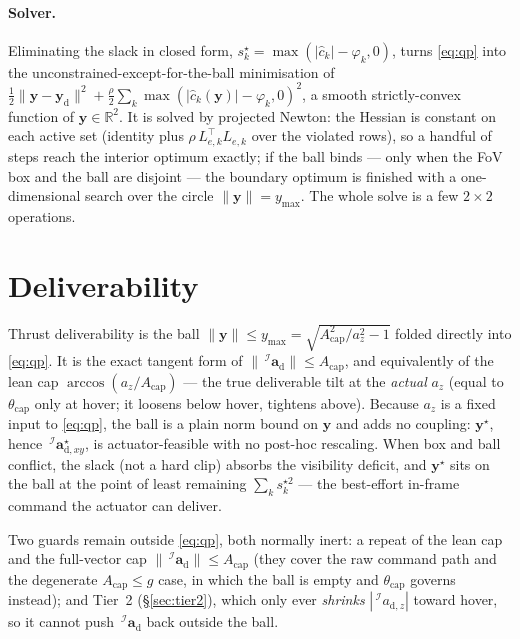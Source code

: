 \documentclass[11pt]{article}
\newcommand{\Iframe}{\mathcal{I}}
\begin{document}
\paragraph{Solver.} Eliminating the slack in closed form, $s_k^\star=\max(|\hat c_k|-\varphi_k,0)$, turns
\eqref{eq:qp} into the unconstrained-except-for-the-ball minimisation of
$\tfrac12\|\boldsymbol{y}-\boldsymbol{y}_\text{d}\|^2+\tfrac{\rho}{2}\sum_k\max(|\hat c_k(\boldsymbol{y})|-\varphi_k,0)^2$,
a smooth strictly-convex function of $\boldsymbol{y}\in\mathbb{R}^2$. It is solved by projected Newton:
the Hessian is constant on each active set (identity plus $\rho\,L_{e,k}^{\!\top}L_{e,k}$ over the
violated rows), so a handful of steps reach the interior optimum exactly; if the ball binds --- only when
the FoV box and the ball are disjoint --- the boundary optimum is finished with a one-dimensional search
over the circle $\|\boldsymbol{y}\|=y_\text{max}$. The whole solve is a few $2\times2$ operations.

\section{Deliverability}\label{sec:deliver}
Thrust deliverability is the ball $\|\boldsymbol{y}\|\le y_\text{max}=\sqrt{A_\text{cap}^2/a_z^2-1}$
folded directly into \eqref{eq:qp}. It is the exact tangent form of $\|\,^\Iframe\boldsymbol{a}_\text{d}\|\le
A_\text{cap}$, and equivalently of the lean cap $\arccos(a_z/A_\text{cap})$ --- the true deliverable tilt
at the \emph{actual} $a_z$ (equal to $\theta_\text{cap}$ only at hover; it loosens below hover, tightens
above). Because $a_z$ is a fixed input to \eqref{eq:qp}, the ball is a plain norm bound on $\boldsymbol{y}$
and adds no coupling: $\boldsymbol{y}^\star$, hence $\,^\Iframe\boldsymbol{a}_{\text{d},xy}^\star$, is
actuator-feasible with no post-hoc rescaling. When box and ball conflict, the slack (not a hard clip)
absorbs the visibility deficit, and $\boldsymbol{y}^\star$ sits on the ball at the point of least
remaining $\sum_k s_k^{\star2}$ --- the best-effort in-frame command the actuator can deliver.
\par\smallskip\noindent
Two guards remain outside \eqref{eq:qp}, both normally inert: a repeat of the lean cap and the full-vector
cap $\|\,^\Iframe\boldsymbol{a}_\text{d}\|\le A_\text{cap}$ (they cover the raw command path and the
degenerate $A_\text{cap}\le g$ case, in which the ball is empty and $\theta_\text{cap}$ governs instead);
and Tier~2 (\S\ref{sec:tier2}), which only ever \emph{shrinks} $|\,^\Iframe a_{\text{d},z}|$ toward hover,
so it cannot push $\,^\Iframe\boldsymbol{a}_\text{d}$ back outside the ball.
\end{document}
